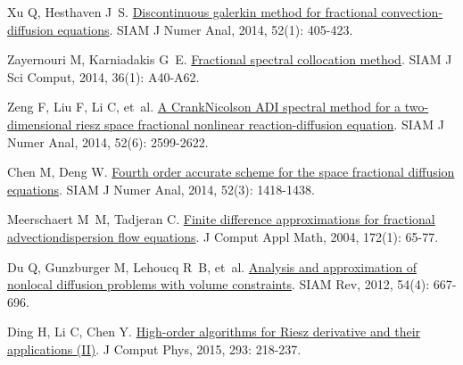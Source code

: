 \begin{thebibliography}{79}
    Xu Q, Hesthaven J~S.
    \newblock \href{https://doi.org/10.1137/130918174}{Discontinuous galerkin method for fractional convection-diffusion equations}\allowbreak[J].
    \newblock SIAM J Numer Anal, 2014, 52\allowbreak (1): 405-423.
    
    Zayernouri M, Karniadakis G~E.
    \newblock \href{https://doi.org/10.1137/130933216}{Fractional spectral collocation method}\allowbreak[J].
    \newblock SIAM J Sci Comput, 2014, 36\allowbreak (1): A40-A62.
    
    Zeng F, Liu F, Li C, et~al.
    \newblock \href{https://doi.org/10.1137/130934192}{A {{Crank}}{\textendash}{{Nicolson ADI}} spectral method for a two-dimensional riesz space fractional nonlinear reaction-diffusion equation}\allowbreak[J].
    \newblock SIAM J Numer Anal, 2014, 52\allowbreak (6): 2599-2622.
    
    Chen M, Deng W.
    \newblock \href{https://doi.org/10.1137/130933447}{Fourth order accurate scheme for the space fractional diffusion equations}\allowbreak[J].
    \newblock SIAM J Numer Anal, 2014, 52\allowbreak (3): 1418-1438.
    
    Meerschaert M~M, Tadjeran C.
    \newblock \href{https://www.sciencedirect.com/science/article/pii/S0377042704000986}{Finite difference approximations for fractional advection{\textendash}dispersion flow equations}\allowbreak[J].
    \newblock J Comput Appl Math, 2004, 172\allowbreak (1): 65-77.
    
    Du Q, Gunzburger M, Lehoucq R~B, et~al.
    \newblock \href{https://doi.org/10.1137/110833294}{Analysis and approximation of nonlocal diffusion problems with volume constraints}\allowbreak[J].
    \newblock SIAM Rev, 2012, 54\allowbreak (4): 667-696.
    
    Ding H, Li C, Chen Y.
    \newblock \href{https://www.sciencedirect.com/science/article/pii/S0021999114004148}{High-order algorithms for {{Riesz}} derivative and their applications ({{II}})}\allowbreak[J].
    \newblock J Comput Phys, 2015, 293: 218-237.
    

\end{thebibliography}
